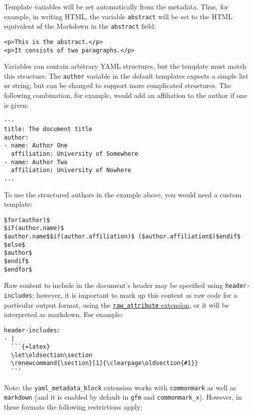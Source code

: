 \documentclass[
]{article}
\begin{document}
Template variables will be set automatically from the metadata. Thus,
for example, in writing HTML, the variable \texttt{abstract} will be set
to the HTML equivalent of the Markdown in the \texttt{abstract} field:

\begin{verbatim}
<p>This is the abstract.</p>
<p>It consists of two paragraphs.</p>
\end{verbatim}

Variables can contain arbitrary YAML structures, but the template must
match this structure. The \texttt{author} variable in the default
templates expects a simple list or string, but can be changed to support
more complicated structures. The following combination, for example,
would add an affiliation to the author if one is given:

\begin{verbatim}
---
title: The document title
author:
- name: Author One
  affiliation: University of Somewhere
- name: Author Two
  affiliation: University of Nowhere
...
\end{verbatim}

To use the structured authors in the example above, you would need a
custom template:

\begin{verbatim}
$for(author)$
$if(author.name)$
$author.name$$if(author.affiliation)$ ($author.affiliation$)$endif$
$else$
$author$
$endif$
$endfor$
\end{verbatim}

Raw content to include in the document's header may be specified using
\texttt{header-includes}; however, it is important to mark up this
content as raw code for a particular output format, using the
\protect\hyperlink{extension-raw_attribute}{\texttt{raw\_attribute}
extension}, or it will be interpreted as markdown. For example:

\begin{verbatim}
header-includes:
- |
  ```{=latex}
  \let\oldsection\section
  \renewcommand{\section}[1]{\clearpage\oldsection{#1}}
  ```
\end{verbatim}

Note: the \texttt{yaml\_metadata\_block} extension works with
\texttt{commonmark} as well as \texttt{markdown} (and it is enabled by
default in \texttt{gfm} and \texttt{commonmark\_x}). However, in these
formats the following restrictions apply:
\end{document}
